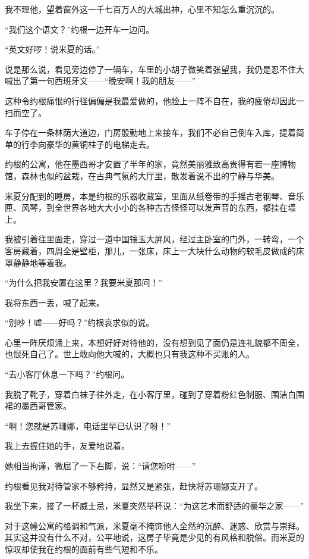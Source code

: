\par 我不理他，望着窗外这一千七百万人的大城出神，心里不知怎么重沉沉的。
\par “我们这个语文？”约根一边开车一边问。
\par “英文好啰！说米夏的话。”
\par 说是那么说，看见旁边停了一辆车，车里的小胡子微笑着张望我，我仍是忍不住大喊出了第一句西班牙文——“晚安啊！我的朋友——”
\par 这种令约根痛恨的行径偏偏是我最爱做的，他脸上一阵不自在，我的疲倦却因此一扫而空了。
\par 车子停在一条林荫大道边，门房殷勤地上来接车，我们不必自己倒车入库，提着简单的行李向豪华的黄铜柱子的电梯走去。
\par 约根的公寓，他在墨西哥才安置了半年的家，竟然美丽雅致高贵得有若一座博物馆，森林也似的盆栽，在古典气氛的大厅里，散发着说不出的宁静与华美。
\par 米夏分配到的睡房，本是约根的乐器收藏室，里面从纸卷带的手摇古老钢琴、音乐匣、风琴，到全世界各地大大小小的各种古古怪怪可以发声音的东西，都挂在墙上。
\par 我被引着往里面走，穿过一道中国镶玉大屏风，经过主卧室的门外，一转弯，一个客房藏着，四周全是壁柜，那儿，一张床，床上一大块什么动物的软毛皮做成的床罩静静地等着我。
\par “为什么把我安置在这里？我要米夏那间！”
\par 我将东西一丢，喊了起来。
\par “别吵！嘘——好吗？”约根哀求似的说。
\par 心里一阵厌烦涌上来，本想好好对待他的，没有想到见了面仍是连礼貌都不周全，也恨死自己了。世上敢向他大喊的，大概也只有我这种不买账的人。
\par “去小客厅休息一下吗？”约根问。
\par 我脱了靴子，穿着白袜子往外走，在小客厅里，碰到了穿着粉红色制服、围洁白围裙的墨西哥管家。
\par “啊！您就是苏珊娜，电话里早已认识了呀！”
\par 我上去握住她的手，友爱地说着。
\par 她相当拘谨，微屈了一下右脚，说：“请您吩咐——”
\par 约根看见我对待管家不够矜持，显然又是紧张，赶快将苏珊娜支开了。
\par 我坐下来，接了一杯威士忌，米夏突然举杯说：“为这艺术而舒适的豪华之家——”
\par 对于这幢公寓的格调和气派，米夏毫不掩饰他人全然的沉醉、迷惑、欣赏与崇拜。其实这并没有什么不对，公平地说，这房子毕竟是少见的有风格和脱俗。而米夏的惊叹却使我在约根的面前有些气短和不乐。
